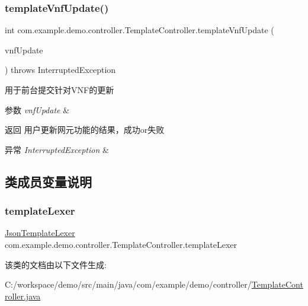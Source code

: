 \subsubsection{\texorpdfstring{template\+Vnf\+Update()}{templateVnfUpdate()}}
{\footnotesize\ttfamily int com.\+example.\+demo.\+controller.\+Template\+Controller.\+template\+Vnf\+Update (\begin{DoxyParamCaption}\item[{@Request\+Body String}]{vnf\+Update }\end{DoxyParamCaption}) throws Interrupted\+Exception}

用于前台提交针对\+V\+N\+F的更新 
\begin{DoxyParams}{参数}
{\em vnf\+Update} & \\
\hline
\end{DoxyParams}
\begin{DoxyReturn}{返回}
用户更新网元功能的结果，成功or失败 
\end{DoxyReturn}

\begin{DoxyExceptions}{异常}
{\em Interrupted\+Exception} & \\
\hline
\end{DoxyExceptions}


\subsection{类成员变量说明}
\mbox{\label{classcom_1_1example_1_1demo_1_1controller_1_1_template_controller_a3eec265b5ae5f560a034936fe8c4c6e7}} 
\subsubsection{\texorpdfstring{template\+Lexer}{templateLexer}}
{\footnotesize\ttfamily \mbox{\hyperlink{classcom_1_1example_1_1demo_1_1templates_1_1_json_template_lexer}{Json\+Template\+Lexer}} com.\+example.\+demo.\+controller.\+Template\+Controller.\+template\+Lexer\hspace{0.3cm}{\ttfamily [private]}}



该类的文档由以下文件生成\+:\begin{DoxyCompactItemize}
\item 
C\+:/workspace/demo/src/main/java/com/example/demo/controller/\mbox{\hyperlink{_template_controller_8java}{Template\+Controller.\+java}}\end{DoxyCompactItemize}
